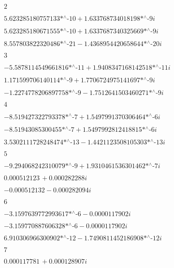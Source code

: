 \noindent\(2\)

\noindent\(\text{5.623285180757133$\grave{ }$*${}^{\wedge}$-10}+\text{1.633768734018198$\grave{ }$*${}^{\wedge}$-9} i\)

\noindent\(\text{5.623285180671555$\grave{ }$*${}^{\wedge}$-10}+\text{1.6337687340325669$\grave{ }$*${}^{\wedge}$-9} i\)

\noindent\(\text{8.557803822320486$\grave{ }$*${}^{\wedge}$-21}-\text{1.4368954420658644$\grave{ }$*${}^{\wedge}$-20} i\)

\noindent\(3\)

\noindent\(-\text{5.5878114549661816$\grave{ }$*${}^{\wedge}$-11}+\text{1.9408347168142518$\grave{ }$*${}^{\wedge}$-11} i\)

\noindent\(\text{1.171599706140114$\grave{ }$*${}^{\wedge}$-9}+\text{1.7706724975141697$\grave{ }$*${}^{\wedge}$-9} i\)

\noindent\(-\text{1.2274778206897758$\grave{ }$*${}^{\wedge}$-9}-\text{1.7512641503460271$\grave{ }$*${}^{\wedge}$-9} i\)

\noindent\(4\)

\noindent\(-\text{8.519427322793378$\grave{ }$*${}^{\wedge}$-7}+\text{1.5497991370306464$\grave{ }$*${}^{\wedge}$-6} i\)

\noindent\(-\text{8.51943085300455$\grave{ }$*${}^{\wedge}$-7}+\text{1.5497992812418815$\grave{ }$*${}^{\wedge}$-6} i\)

\noindent\(\text{3.5302111728248474$\grave{ }$*${}^{\wedge}$-13}-\text{1.4421123508105303$\grave{ }$*${}^{\wedge}$-13} i\)

\noindent\(5\)

\noindent\(-\text{9.294068242310079$\grave{ }$*${}^{\wedge}$-9}+\text{1.9310461536301462$\grave{ }$*${}^{\wedge}$-7} i\)

\noindent\(0.000512123\, +0.000282288 i\)

\noindent\(-0.000512132-0.000282094 i\)

\noindent\(6\)

\noindent\(-\text{3.1597639772993617$\grave{ }$*${}^{\wedge}$-6}-0.0000117902 i\)

\noindent\(-\text{3.159770887606328$\grave{ }$*${}^{\wedge}$-6}-0.0000117902 i\)

\noindent\(\text{6.910306966300902$\grave{ }$*${}^{\wedge}$-12}-\text{1.7490811452186908$\grave{ }$*${}^{\wedge}$-12} i\)

\noindent\(7\)

\noindent\(0.000117781\, +0.000128907 i\)

